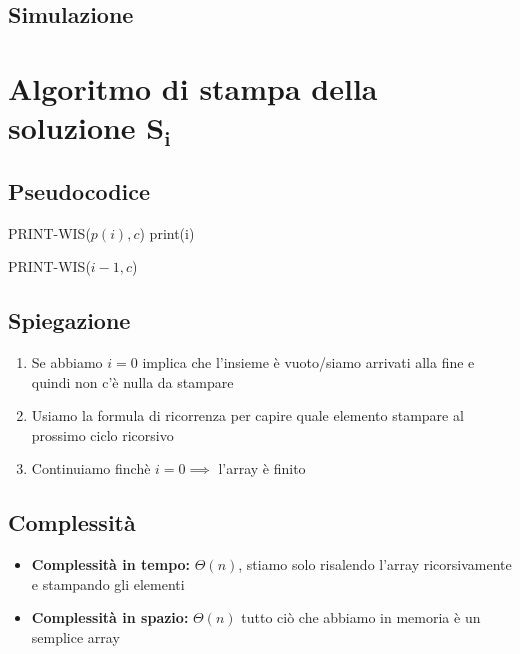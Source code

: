 \subsection{Simulazione}


\newpage
\section{Algoritmo di stampa della soluzione $\mathbf{S_i}$}
\subsection{Pseudocodice}
\begin{algorithm}
    \caption{PRINT-WIS}
    \begin{algorithmic}
            \State \Return

            \Else
                    \State PRINT-WIS($p(i),c$) 
                    \State print(i)

                    \Else
                        \State PRINT-WIS($i-1,c$) 
                \EndIf
        \EndIf
        \EndProcedure
    \end{algorithmic}
\end{algorithm}
\subsection{Spiegazione}
\begin{enumerate}
    \item Se abbiamo $i=0$ implica che l'insieme è vuoto/siamo arrivati alla fine e quindi non c'è nulla da stampare
    \item Usiamo la formula di ricorrenza per capire quale elemento stampare al prossimo ciclo ricorsivo
    \item Continuiamo finchè $i=0 \implies$ l'array è finito
\end{enumerate}
\subsection{Complessità}
\begin{itemize}
    \item \textbf{Complessità in tempo:} $\Theta(n)$, stiamo solo risalendo l'array ricorsivamente e stampando gli elementi
    \item \textbf{Complessità in spazio:} $\Theta(n)$ tutto ciò che abbiamo in memoria è un semplice array
\end{itemize}


